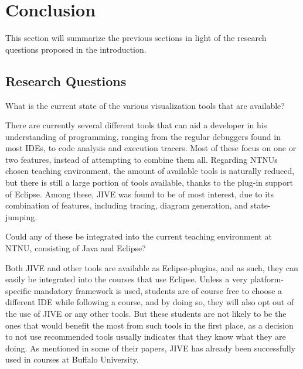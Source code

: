 \section{Conclusion}\label{conclusion}
This section will summarize the previous sections in light of the research questions proposed in the introduction.

\subsection{Research Questions}\label{conclusionRQs}


\begin{theorem}
What is the current state of the various visualization tools that are available?
\end{theorem}

There are currently several different tools that can aid a developer in his understanding of programming, ranging from the regular debuggers found in most IDEs, to code analysis and execution tracers.
Most of these focus on one or two features, instead of attempting to combine them all.
Regarding NTNUs chosen teaching environment, the amount of available tools is naturally reduced, but there is still a large portion of tools available, thanks to the plug-in support of Eclipse.
Among these, JIVE was found to be of most interest, due to its combination of features, including tracing, diagram generation, and state-jumping.
~\\

\begin{theorem}
Could any of these be integrated into the current teaching environment at NTNU, consisting of Java and Eclipse?
\end{theorem}

Both JIVE and other tools are available as Eclipse-plugins, and as such, they can easily be integrated into the courses that use Eclipse.
Unless a very platform-specific mandatory framework is used, students are of course free to choose a different IDE while following  a course, and by doing so, they will also opt out of the use of JIVE or any other tools.
But these students are not likely to be the ones that would benefit the most from such tools in the first place, as a decision to not use recommended tools usually indicates that they know what they are doing. %
As mentioned in some of their papers, JIVE has already been successfully used in courses at Buffalo University.%
~\\

